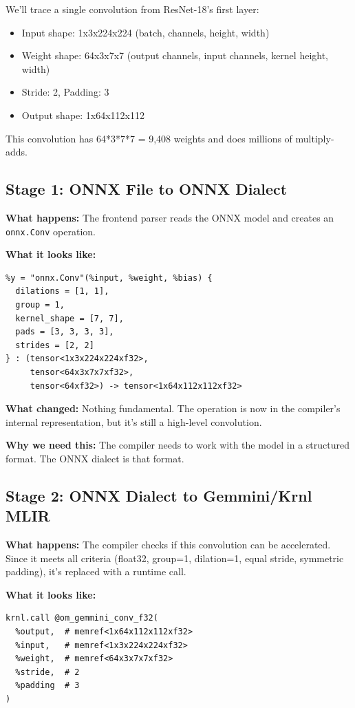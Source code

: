 \documentclass[12pt,a4paper]{article}
\begin{document}
\begin{sidebarbox}
We'll trace a single convolution from ResNet-18's first layer:
\begin{itemize}
  \item Input shape: 1x3x224x224 (batch, channels, height, width)
  \item Weight shape: 64x3x7x7 (output channels, input channels, kernel height, width)
  \item Stride: 2, Padding: 3
  \item Output shape: 1x64x112x112
\end{itemize}
This convolution has 64*3*7*7 = 9,408 weights and does millions of multiply-adds.
\end{sidebarbox}

\subsection{Stage 1: ONNX File to ONNX Dialect}

\textbf{What happens:} The frontend parser reads the ONNX model and creates an \texttt{onnx.Conv} operation.

\textbf{What it looks like:}
\begin{lstlisting}
%y = "onnx.Conv"(%input, %weight, %bias) {
  dilations = [1, 1],
  group = 1,
  kernel_shape = [7, 7],
  pads = [3, 3, 3, 3],
  strides = [2, 2]
} : (tensor<1x3x224x224xf32>,
     tensor<64x3x7x7xf32>,
     tensor<64xf32>) -> tensor<1x64x112x112xf32>
\end{lstlisting}

\textbf{What changed:} Nothing fundamental. The operation is now in the compiler's internal representation, but it's still a high-level convolution.

\textbf{Why we need this:} The compiler needs to work with the model in a structured format. The ONNX dialect is that format.

\subsection{Stage 2: ONNX Dialect to Gemmini/Krnl MLIR}

\textbf{What happens:} The compiler checks if this convolution can be accelerated. Since it meets all criteria (float32, group=1, dilation=1, equal stride, symmetric padding), it's replaced with a runtime call.

\textbf{What it looks like:}
\begin{lstlisting}
krnl.call @om_gemmini_conv_f32(
  %output,  # memref<1x64x112x112xf32>
  %input,   # memref<1x3x224x224xf32>
  %weight,  # memref<64x3x7x7xf32>
  %stride,  # 2
  %padding  # 3
)
\end{lstlisting}
\end{document}

